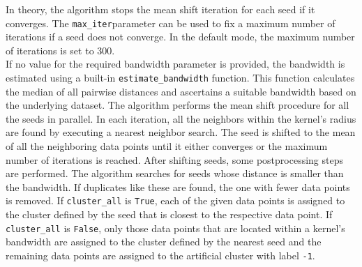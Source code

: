In theory, the algorithm stops the mean shift iteration for each seed if it converges. The \texttt{max_iter}parameter can be used to fix a maximum number of iterations if a seed does not converge. In the default mode, the maximum number of iterations is set to 300.\\
If no value for the required bandwidth parameter is provided, the bandwidth is estimated using a built-in \texttt{estimate_bandwidth} function. This function calculates the median of all pairwise distances and ascertains a suitable bandwidth based on the underlying dataset.\newline
The algorithm performs the mean shift procedure for all the seeds in parallel. In each iteration, all the neighbors within the kernel's radius are found by executing a nearest neighbor search. The seed is shifted to the mean of all the neighboring data points until it either converges or the maximum number of iterations is reached. 
After shifting seeds, some postprocessing steps are performed. The algorithm searches for seeds whose distance is smaller than the bandwidth. If duplicates like these are found, the one with fewer data points is removed. If \texttt{cluster_all} is \texttt{True}, each of the given data points is assigned to the cluster defined by the seed that is closest to the respective data point. If \texttt{cluster_all} is \texttt{False}, only those data points that are located within a kernel's bandwidth are assigned to the cluster defined by the nearest seed and the remaining data points are assigned to the artificial cluster with label \texttt{-1}.